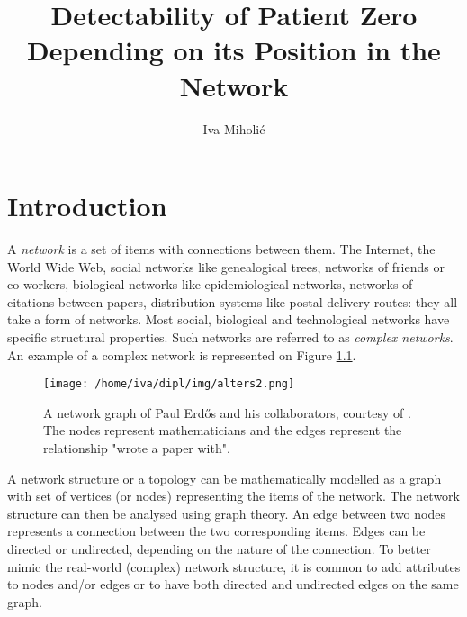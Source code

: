 \documentclass[times, utf8, diplomski]{fer}
\begin{document}


\title{Detectability of Patient Zero Depending on its Position in the Network}

\author{Iva Miholić}

\maketitle

\izvornik

\zahvala{}

\tableofcontents
\listoffigures
\listofalgorithms
{}

\chapter{Introduction}

A \emph{network} is a set of items with connections between them. The Internet, the World Wide Web, social networks like genealogical trees, networks of friends or co-workers, biological networks like epidemiological networks, networks of citations between papers, distribution systems like postal delivery routes: they all take a form of networks. Most social, biological and technological networks have specific structural properties. Such networks are referred to as \emph{complex networks}.  An example of a complex network is represented on Figure \ref{net}.

\begin{figure}[htp]
\centering
\texttt{[image: /home/iva/dipl/img/alters2.png]}
\caption{A network graph of Paul Erd{\H{o}}s and his collaborators, courtesy of \citet{krebs}. The nodes represent mathematicians and the edges represent the relationship "wrote a paper with".}
\label{net}
\end{figure}
A network structure or a topology can be mathematically modelled as a graph with set of vertices (or nodes) representing the items of the network. The network structure can then be analysed using graph theory. An edge between two nodes represents a connection between the two corresponding items. Edges can be directed or undirected, depending  on the nature of the connection.  To better mimic the real-world (complex) network structure, it is common to add attributes to nodes and/or edges or to have both directed and undirected edges on the same graph.
\end{document}

